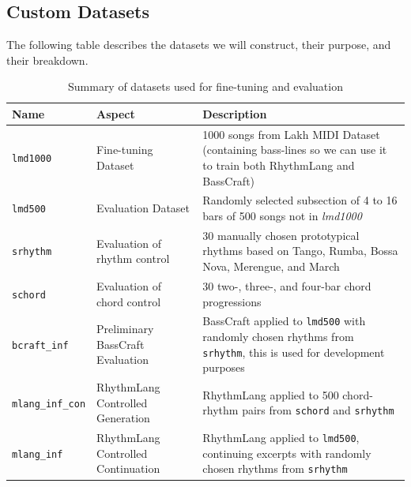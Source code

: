 \subsection{Custom Datasets}
The following table describes the datasets we will construct, their purpose, and their breakdown. 
\begin{table}[H]
    \centering
    \renewcommand{\arraystretch}{1.3}
    \begin{tabular}{|l|p{4cm}|p{7cm}|}
        \hline
        \textbf{Name} & \textbf{Aspect} & \textbf{Description} \\
        \hline
        \texttt{lmd1000} & Fine-tuning Dataset & 1000 songs from Lakh MIDI Dataset \cite{Raffel_2016} (containing bass-lines so we can use it to train both RhythmLang and BassCraft) \\
        \hline
        \texttt{lmd500} & Evaluation Dataset & Randomly selected subsection of 4 to 16 bars of 500 songs not in \textit{lmd1000} \\
        \hline
        \texttt{srhythm} & Evaluation of rhythm control & 30 manually chosen prototypical rhythms based on \cite{Chew_Volk_Lee_Dance_metric_weight_2005} Tango, Rumba, Bossa Nova, Merengue, and March \\
        \hline
        \texttt{schord} & Evaluation of chord control & 30 two-, three-, and four-bar chord progressions \\
        \hline
        \texttt{bcraft\_inf} & Preliminary BassCraft Evaluation & BassCraft applied to \texttt{lmd500} with randomly chosen rhythms from \texttt{srhythm}, this is used for development purposes \\
        \hline
        \texttt{mlang\_inf\_con} & RhythmLang Controlled Generation & RhythmLang applied to 500 chord-rhythm pairs from \texttt{schord} and \texttt{srhythm} \\
        \hline
        \texttt{mlang\_inf} & RhythmLang Controlled Continuation & RhythmLang applied to \texttt{lmd500}, continuing excerpts with randomly chosen rhythms from \texttt{srhythm} \\
        \hline
    \end{tabular}
    \caption{Summary of datasets used for fine-tuning and evaluation}
    \label{tab:dataset_summary}
\end{table}


